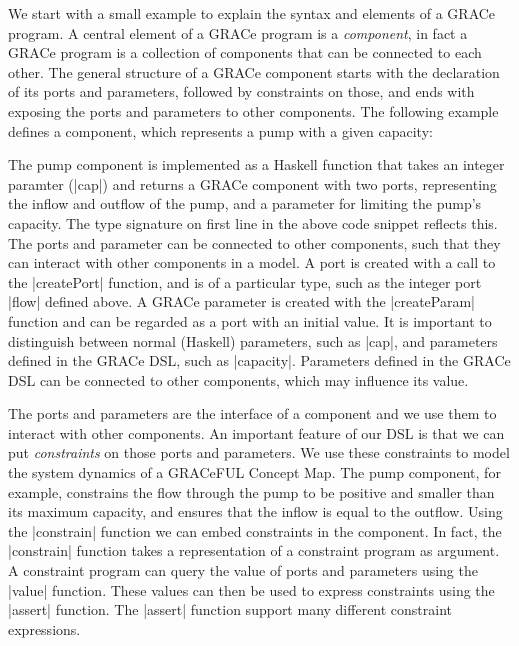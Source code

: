 \documentclass{article}
\begin{document}
We start with a small example to explain the syntax and elements of a GRACe
program. A central element of a GRACe program is a \emph{component}, in fact a
GRACe program is a collection of components that can be connected to each other.
The general structure of a GRACe component starts with the declaration of its
ports and parameters, followed by constraints on those, and ends with exposing
the ports and parameters to other components. The following example defines a
component, which represents a pump with a given capacity:
The pump component is implemented as a Haskell function that takes an integer
paramter (|cap|) and returns a GRACe component with two ports, representing the
inflow and outflow of the pump, and a parameter for limiting the pump's
capacity. The type signature on first line in the above code snippet reflects
this. The ports and parameter can be connected to other components, such that
they can interact with other components in a model. A port is created with a
call to the |createPort| function, and is of a particular type, such as the
integer port |flow| defined above. A GRACe parameter is created with the
|createParam| function and can be regarded as a port with an initial value. It
is important to distinguish between normal (Haskell) parameters, such as |cap|,
and parameters defined in the GRACe DSL, such as |capacity|. Parameters defined
in the GRACe DSL can be connected to other components, which may influence its
value. 

The ports and parameters are the interface of a component and we use them to
interact with other components. An important feature of our DSL is that we can
put \emph{constraints} on those ports and parameters. We use these constraints
to model the system dynamics of a GRACeFUL Concept Map. The pump component, for
example, constrains the flow through the pump to be positive and smaller than
its maximum capacity, and ensures that the inflow is equal to the outflow. Using
the |constrain| function we can embed constraints in the component. In fact, the
|constrain| function takes a representation of a constraint program as argument.
A constraint program can query the value of ports and parameters using the
|value| function. These values can then be used to express constraints using the
|assert| function. The |assert| function support many different constraint
expressions.
\end{document}
